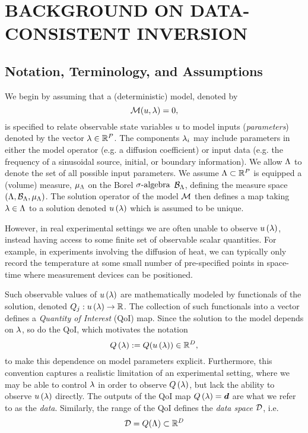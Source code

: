 \chapter{\uppercase{Background on Data-Consistent Inversion} \label{chapter:02}}

\section{Notation, Terminology, and Assumptions}

We begin by assuming that a (deterministic) model, denoted by $$\operatorname*{\mathcal{M}} (u, \lambda) = 0,$$ is specified to relate observable state variables $u$ to model inputs ({\em parameters}) denoted by the vector $\lambda\in\mathbb{R}^P$.
The components $\lambda_i$ may include parameters in either the model operator (e.g. a diffusion coefficient) or input data (e.g. the frequency of a sinusoidal source, initial, or boundary information).
We allow ${\Lambda}$ to denote the set of all possible input parameters. 
We assume ${\Lambda}\subset\mathbb{R}^P$ is equipped a (volume) measure, $\mu_{{\Lambda}}$ on the Borel $\sigma\text{-algebra}$ $\mathcal{B}_{{\Lambda}}$, defining the measure space $({\Lambda}, \mathcal{B}_{{\Lambda}}, \mu_{{\Lambda}})$.
The solution operator of the model $\operatorname*{\mathcal{M}}$ then defines a map taking $\lambda\in{\Lambda}$ to a solution denoted $u\left ( \lambda \right )$ which is assumed to be unique. 

However, in real experimental settings we are often unable to observe $u\left ( \lambda \right )$, instead having access to some finite set of observable scalar quantities. 
For example, in experiments involving the diffusion of heat, we can typically only record the temperature at some small number of pre-specified points in space-time where measurement devices can be positioned.

Such observable values of $u\left ( \lambda \right )$ are mathematically modeled by functionals of the solution, denoted $Q_j: u\left ( \lambda \right ) \to \mathbb{R}$.
The collection of such functionals into a vector defines a {\em Quantity of Interest} (QoI) map. 
Since the solution to the model depends on $\lambda$, so do the QoI, which motivates the notation 
$$Q\left ( \lambda \right ) := Q( u\left ( \lambda \right ) ) \in\mathbb{R}^D,$$
to make this dependence on model parameters explicit.
Furthermore, this convention captures a realistic limitation of an experimental setting, where we may be able to control $\lambda$ in order to observe $Q\left ( \lambda \right )$, but lack the ability to observe $u\left ( \lambda \right )$ directly.
The outputs of the QoI map $Q\left ( \lambda \right ) = \operatorname*{\boldsymbol{d}}$ are what we refer to as the \emph{data}. 
Similarly, the range of the QoI defines the \emph{data space} $\mathcal{D}$, i.e. 
$$\mathcal{D} = Q({\Lambda}) \subset \mathbb{R}^D$$

